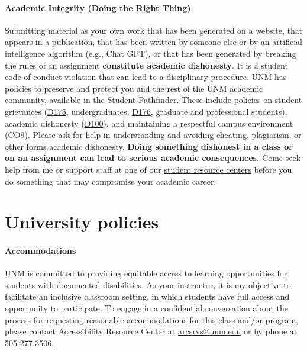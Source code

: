 \documentclass[11pt]{article}
\begin{document}







\paragraph{Academic Integrity (Doing the Right Thing)} Submitting material as your own work that has been generated on a website, that appears in a publication, that has been written by someone else or by an artificial intelligence algorithm (e.g., Chat GPT), or that has been generated by breaking the rules of an assignment \textbf{constitute academic dishonesty}. It is a student code-of-conduct violation that can lead to a disciplinary procedure. UNM has policies to preserve and protect you and the rest of the UNM academic community, available in the \href{https://pathfinder.unm.edu/}{Student Pathfinder}. These include policies on student grievances (\href{https://handbook.unm.edu/d175/}{D175}, undergraduates; \href{https://handbook.unm.edu/d176/}{D176,} graduate and professional students), academic dishonesty (\href{https://handbook.unm.edu/d100/}{D100}), and maintaining a respectful campus environment (\href{https://handbook.unm.edu/c09/}{CO9}). Please ask for help in understanding and avoiding cheating, plagiarism, or other forms academic dishonesty. \textbf{Doing something dishonest in a class or on an assignment can lead to serious academic consequences.} Come seek help from me or support staff at one of our \href{https://students.unm.edu/find-your-pack/resource-centers.html}{student resource centers} before you do something that may compromise your academic career.%
\vspace{-5pt}

\section*{University policies}
\paragraph{Accommodations} UNM is committed to providing equitable access to learning opportunities for students with documented disabilities. As your instructor, it is my objective to facilitate an inclusive classroom setting, in which students have full access and opportunity to participate. To engage in a confidential conversation about the process for requesting reasonable accommodations for this class and/or program, please contact Accessibility Resource Center at \href{arcsrvs@unm.edu}{arcsrvs@unm.edu} or by phone at 505-277-3506.
\end{document}
